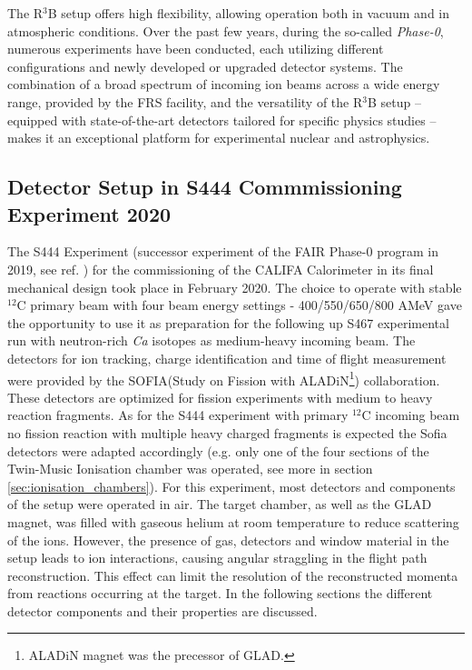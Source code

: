 The R$^3$B setup offers high flexibility, allowing operation both in vacuum and in atmospheric conditions. Over the past few years, during the so-called \textit{Phase-0}, numerous experiments have been conducted, each utilizing different configurations and newly developed or upgraded detector systems.\newline  
The combination of a broad spectrum of incoming ion beams across a wide energy range, provided by the FRS facility, and the versatility of the R$^3$B setup -- equipped with state-of-the-art detectors tailored for specific physics studies -- makes it an exceptional platform for experimental nuclear and astrophysics.

\subsection{Detector Setup in S444 Commmissioning Experiment 2020}
The S444 Experiment (successor experiment of the FAIR Phase-0 program in 2019, see ref. \cite{ponnath2024measurement}) for the commissioning of the CALIFA Calorimeter in its final mechanical design took place in February 2020. The choice to operate with stable $^{12}$C primary beam with four beam energy settings - 400/550/650/800 AMeV  gave the opportunity to use it as preparation for the following up S467 experimental run with neutron-rich \textit{Ca} isotopes as medium-heavy incoming beam. The detectors for ion tracking, charge identification and time of flight measurement were provided by the SOFIA(Study on Fission with ALADiN\footnote{ALADiN magnet was the precessor of GLAD.}) collaboration. These detectors are optimized for fission experiments with medium to heavy reaction fragments. As for the S444 experiment with primary $^{12}$C incoming beam no fission reaction with multiple heavy charged fragments is expected the Sofia detectors were adapted accordingly (e.g. only one of the four sections of the Twin-Music Ionisation chamber was operated, see more in section \ref{sec:ionisation_chambers}).\newline
For this experiment, most detectors and components of the setup were operated in air. The target chamber, as well as the GLAD magnet, was filled with gaseous helium at room temperature to reduce scattering of the ions.\newline 
However, the presence of gas, detectors and window material in the setup leads to ion interactions, causing angular straggling in the flight path reconstruction. This effect can limit the resolution of the reconstructed momenta from reactions occurring at the target.\newline
In the following sections the different detector components and their properties are discussed.\newline

